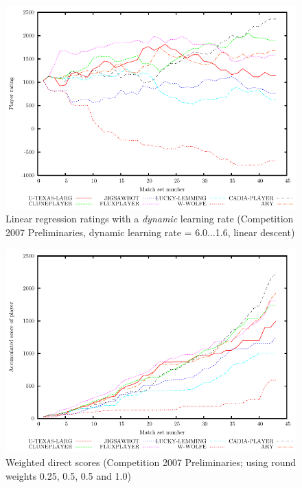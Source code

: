 \documentclass[a4paper,10pt]{article}
\begin{document}
\begin{figure}
 \centering
 \includegraphics[width=\textwidth]{dynamic_linear_regression_60}
 \caption{Linear regression ratings with a \textit{dynamic} learning rate (Competition 2007 Preliminaries, dynamic learning rate = 6.0$\dotsc$1.6, linear descent)}
 \label{fig:dynamic_linear_regression}
\end{figure}

\begin{figure}
 \centering
 \includegraphics[width=\textwidth]{direct_scores}
 \caption{Weighted direct scores (Competition 2007 Preliminaries; using round weights 0.25, 0.5, 0.5 and 1.0)}
 \label{fig:direct_scores}
\end{figure}
\end{document}
